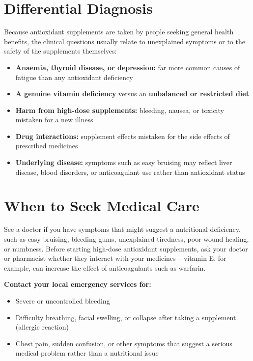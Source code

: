 \section*{Differential Diagnosis}
Because antioxidant supplements are taken by people seeking general health benefits, the clinical questions usually relate to unexplained symptoms or to the safety of the supplements themselves:

\begin{itemize}
    \item \textbf{Anaemia, thyroid disease, or depression:} far more common causes of fatigue than any antioxidant deficiency
    \item \textbf{A genuine vitamin deficiency} versus an \textbf{unbalanced or restricted diet}
    \item \textbf{Harm from high-dose supplements:} bleeding, nausea, or toxicity mistaken for a new illness
    \item \textbf{Drug interactions:} supplement effects mistaken for the side effects of prescribed medicines
    \item \textbf{Underlying disease:} symptoms such as easy bruising may reflect liver disease, blood disorders, or anticoagulant use rather than antioxidant status
\end{itemize}

\section*{When to Seek Medical Care}
See a doctor if you have symptoms that might suggest a nutritional deficiency, such as easy bruising, bleeding gums, unexplained tiredness, poor wound healing, or numbness. Before starting high-dose antioxidant supplements, ask your doctor or pharmacist whether they interact with your medicines -- vitamin E, for example, can increase the effect of anticoagulants such as warfarin.

\textbf{Contact your local emergency services for:}
\begin{itemize}
    \item Severe or uncontrolled bleeding
    \item Difficulty breathing, facial swelling, or collapse after taking a supplement (allergic reaction)
    \item Chest pain, sudden confusion, or other symptoms that suggest a serious medical problem rather than a nutritional issue
\end{itemize}

